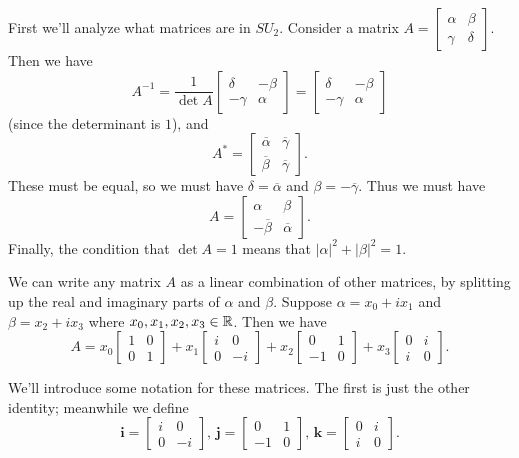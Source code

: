 First we'll analyze what matrices are in $SU_2$. Consider a matrix $A = \begin{bmatrix} \alpha & \beta \\ \gamma & \delta \end{bmatrix}$. Then we have \[A^{-1} = \frac{1}{\det A} \begin{bmatrix} \delta & -\beta \\ -\gamma & \alpha \end{bmatrix} = \begin{bmatrix} \delta & -\beta \\ -\gamma & \alpha \end{bmatrix}\] (since the determinant is $1$), and \[A^* = \begin{bmatrix} \overline{\alpha} & \overline{\gamma} \\ \overline{\beta} & \overline{\gamma} \end{bmatrix}.\] These must be equal, so we must have $\delta = \overline{\alpha} $ and $\beta = - \overline{\gamma}$. 
Thus we must have \[A = \begin{bmatrix}\alpha & \beta \\ -\overline{\beta} & \overline{\alpha} \end{bmatrix}.\] Finally, the condition that $\det A = 1$ means that $|\alpha|^2 + |\beta|^2 = 1$. 

We can write any matrix $A$ as a linear combination of other matrices, by splitting up the real and imaginary parts of $\alpha$ and $\beta$. Suppose $\alpha = x_0 + i x_1$ and $\beta = x_2 + i x_3$ where $x_0, x_1, x_2, x_3 \in \mathbb R$. Then we have
\[ A = x_0 \begin{bmatrix} 1 & 0 \\ 0 & 1\end{bmatrix} + x_1 \begin{bmatrix} i & 0 \\ 0 & -i \end{bmatrix} + x_2 \begin{bmatrix} 0 & 1 \\ -1 & 0 \end{bmatrix} + x_3 \begin{bmatrix} 0 & i \\ i & 0 \end{bmatrix} .\] 

We'll introduce some notation for these matrices. The first is just the other identity; meanwhile we define
\[ \mathbf{i} = \begin{bmatrix} i & 0 \\ 0 & -i \end{bmatrix}, \, \mathbf{j} = \begin{bmatrix}0 & 1 \\ -1 & 0 \end{bmatrix}, \, \mathbf{k} = \begin{bmatrix} 0 & i \\ i & 0 \end{bmatrix} . \]


